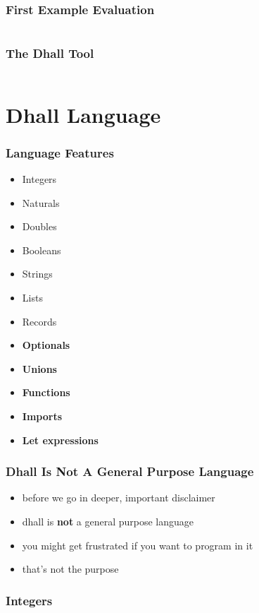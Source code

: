 \documentclass{beamer}
\begin{document}
 \begin{frame}
   \frametitle{First Example \textemdash{} Evaluation}
   \inputminted[fontsize=\small]{text}{static-source/example.dhall.out}
 \end{frame}

 \begin{frame}
   \frametitle{The Dhall Tool}
   \inputminted[fontsize=\scriptsize]{text}{static-source/dhall-help.out}
 \end{frame}

 \section{Dhall Language}

 \begin{frame}
   \frametitle{Language Features}
   \begin{itemize}
   \item Integers
   \item Naturals
   \item Doubles
   \item Booleans
   \item Strings
   \item Lists
   \item Records
   \item \textbf{Optionals}
   \item \textbf{Unions}
   \item \textbf{Functions}
   \item \textbf{Imports}
   \item \textbf{Let expressions}
   \end{itemize}
 \end{frame}

 \begin{frame}
   \frametitle{Dhall Is Not A General Purpose Language}
   \begin{itemize}
   \item before we go in deeper, important disclaimer
   \item dhall is \textbf{not} a general purpose language
   \item you might get frustrated if you want to program in it
   \item that's not the purpose
   \end{itemize}
 \end{frame}

 \begin{frame}[fragile]
   \frametitle{Integers}
   \inputminted{text}{static-source/ints.out}
 \end{frame}
\end{document}
